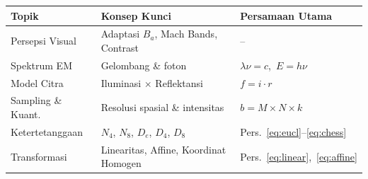 \documentclass[12pt,a4paper]{article}
\begin{document}
\begin{center}
\renewcommand{\arraystretch}{1.4}
\begin{tabular}{@{}lll@{}}
  \toprule
  \textbf{Topik} & \textbf{Konsep Kunci} & \textbf{Persamaan Utama} \\
  \midrule
  Persepsi Visual    & Adaptasi $B_a$, Mach Bands, Contrast  & -- \\
  Spektrum EM        & Gelombang \& foton                    & $\lambda\nu=c$,\ $E=h\nu$ \\
  Model Citra        & Iluminasi $\times$ Reflektansi         & $f=i\cdot r$ \\
  Sampling \& Kuant. & Resolusi spasial \& intensitas         & $b=M\times N\times k$ \\
  Ketertetanggaan    & $N_4$, $N_8$, $D_e$, $D_4$, $D_8$   & Pers.~\eqref{eq:eucl}--\eqref{eq:chess} \\
  Transformasi       & Linearitas, Affine, Koordinat Homogen & Pers.~\eqref{eq:linear},~\eqref{eq:affine} \\
  \bottomrule
\end{tabular}
\end{center}
 
\end{document}
